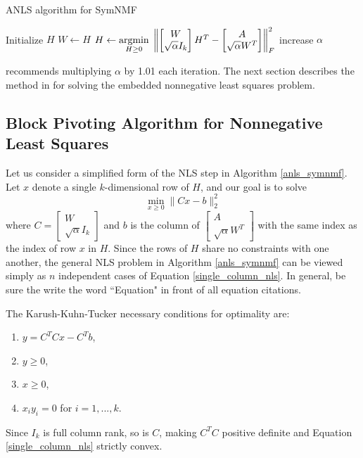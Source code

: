 \begin{algorithm}
\caption{ANLS algorithm for SymNMF}
\label{anls_symnmf}
\begin{algorithmic}[1]
\State Initialize $H$
\Repeat
  \State $W \gets H$
  \State $H \gets \underset{H \geq 0}{\mathrm{arg min}}\;
    \left\lVert \begin{bmatrix} W \\ \sqrt{\alpha} I_k \end{bmatrix} H^T
         - \begin{bmatrix} A \\ \sqrt{\alpha} W^T \end{bmatrix} \right\rVert_F^2$
  \State increase $\alpha$
\end{algorithmic}
\end{algorithm}

\cite{Kuang:15} recommends multiplying $\alpha$ by 1.01 each iteration.
The next section describes the method in \cite{Kim:11} for solving the
embedded nonnegative least squares problem.

\subsection{Block Pivoting Algorithm for Nonnegative Least Squares}
Let us consider a simplified form of the NLS step in Algorithm
\ref{anls_symnmf}. Let $x$ denote a single $k$-dimensional row of $H$,
and our goal is to solve
\begin{equation} \label{single_column_nls}
\min_{x \geq 0} \| C x - b \|_2^2
\end{equation}
where $C = \begin{bmatrix} W \\ \sqrt{\alpha} I_k \end{bmatrix}$ and
$b$ is the column of
$\begin{bmatrix} A \\ \sqrt{\alpha} W^T \end{bmatrix}$ with the same
index as the index of row $x$ in $H$. Since the rows of $H$ share no
constraints with one another, the general NLS problem in Algorithm
\ref{anls_symnmf} can be viewed simply as $n$ independent cases of
Equation \ref{single_column_nls}.
{\color{red}In general, be sure the write the word ``Equation" in front
of all equation citations.}

The Karush-Kuhn-Tucker necessary conditions for optimality are:
\begin{enumerate}
\item
$y = C^T C x - C^T b$,
\item
$y \geq 0$,
\item
$x \geq 0$,
\item
$x_i y_i = 0$ for $i = 1, ..., k$.
\end{enumerate}
Since $I_k$ is full column rank, so is $C$, making $C^T C$ positive
definite and Equation \ref{single_column_nls} strictly convex.

